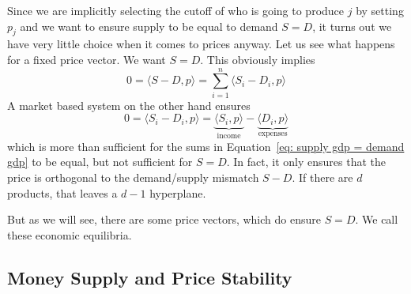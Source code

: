Since we are implicitly selecting the cutoff of who is going to produce \(j\) by
setting \(p_j\) and we want to ensure supply to be equal to demand \(S=D\), it
turns out we have very little choice when it comes to prices anyway. Let us see
what happens for a fixed price vector. We want \(S=D\). This obviously implies
\begin{equation}
	\label{eq: supply gdp = demand gdp}
	0 =\langle S-D,p\rangle =  \sum_{i=1}^n \langle S_i - D_i, p\rangle
\end{equation}
A market based system on the other hand ensures
\[
	0 = \langle S_i - D_i, p\rangle
	= \underbrace{\langle S_i, p\rangle}_{\text{income}}
	- \underbrace{\langle D_i,p\rangle}_{\text{expenses}}
\]
which is more than sufficient for the sums in Equation~\eqref{eq: supply gdp =
demand gdp} to be equal, but not sufficient for \(S=D\). In fact, it only
ensures that the price is orthogonal to the demand/supply mismatch \(S-D\).
If there are \(d\) products, that leaves a \(d-1\) hyperplane.

But as we will see, there are some price vectors, which do ensure \(S=D\).
We call these economic equilibria.

\subsection{Money Supply and Price Stability}

